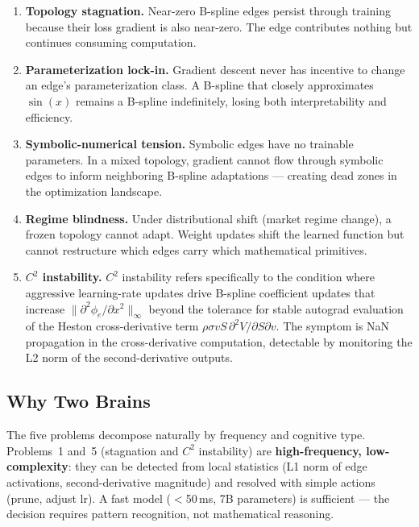\documentclass[11pt,a4paper]{article}
\begin{document}
\begin{enumerate}[nosep]
  \item \textbf{Topology stagnation.} Near-zero B-spline edges persist through training
  because their loss gradient is also near-zero. The edge contributes nothing but
  continues consuming computation.

  \item \textbf{Parameterization lock-in.} Gradient descent never has incentive to
  change an edge's parameterization class. A B-spline that closely approximates
  $\sin(x)$ remains a B-spline indefinitely, losing both interpretability and
  efficiency.

  \item \textbf{Symbolic-numerical tension.} Symbolic edges have no trainable
  parameters. In a mixed topology, gradient cannot flow through symbolic edges to
  inform neighboring B-spline adaptations --- creating dead zones in the optimization
  landscape.

  \item \textbf{Regime blindness.} Under distributional shift (market regime change),
  a frozen topology cannot adapt. Weight updates shift the learned function but cannot
  restructure which edges carry which mathematical primitives.

  \item \textbf{$C^2$ instability.} $C^2$ instability refers specifically to the
  condition where aggressive learning-rate updates drive B-spline coefficient updates
  that increase $\|\partial^2\phi_e/\partial x^2\|_\infty$ beyond the tolerance for
  stable autograd evaluation of the Heston cross-derivative term
  $\rho\sigma vS\,\partial^2 V/\partial S\partial v$. The symptom is NaN propagation
  in the cross-derivative computation, detectable by monitoring the L2 norm of the
  second-derivative outputs.
\end{enumerate}

\subsection{Why Two Brains}
\label{sec:intro:twobrains}

The five problems decompose naturally by frequency and cognitive type. Problems~1
and~5 (stagnation and $C^2$ instability) are \textbf{high-frequency, low-complexity}:
they can be detected from local statistics (L1 norm of edge activations,
second-derivative magnitude) and resolved with simple actions (prune, adjust lr).
A fast model ($<$50\,ms, 7B parameters) is sufficient --- the decision requires
pattern recognition, not mathematical reasoning.
\end{document}
